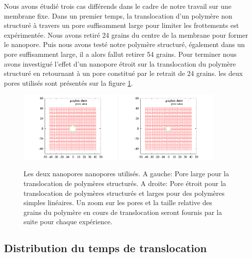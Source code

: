  
 Nous avons étudié trois cas différends dans le cadre de notre travail sur une membrane fixe. Dans un premier temps, la translocation d'un polymère non structuré à travers un pore suffisamment large pour limiter les frottements est expérimentée. Nous avons retiré 24 grains du centre de la membrane pour former le nanopore. Puis nous avons testé notre polymère structuré, également dans un pore suffisamment large, il a alors fallut retirer 54 grains. Pour terminer nous avons investigué l'effet d'un nanopore étroit sur la translocation du polymère structuré en retournant à un pore constitué par le retrait de 24 grains. les deux pores utilisés sont présentés sur la figure \ref{bothpores}.
 \begin{figure}[H]
\begin{center}
\includegraphics[width=0.45\textwidth]{holebigger.pdf} \includegraphics[width=0.45\textwidth]{holesmall.pdf}

\caption[Nanopores utilisés]{Les deux nanopores nanopores utilisés. A gauche: Pore large pour la translocation de polymères structurés. A droite: Pore étroit pour la translocation de polymères structurés et larges pour des polymères simples linéaires. Un zoom sur les pores et la taille relative des grains du polymère en cours de translocation seront fournis par la suite  pour chaque expérience.}
\label{bothpores}
\end{center}
\end{figure}

\subsection{Distribution du temps de translocation}

